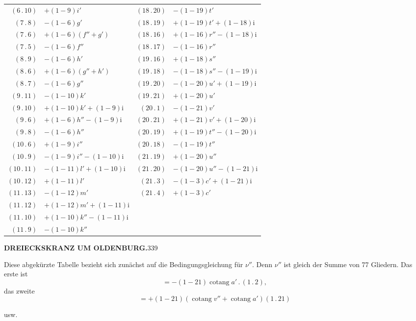 \begin{center}
\begin{tabular}{|r|l||r|l|}
\((6\,.\,10)\)&\(+(1-9)i'\)&\((18\,.\,20)\)&\(-(1-19)t'\)\\
\((7\,.\,8)\)&\(-(1-6)g'\)&\((18\,.\,19)\)&\(+(1-19)t'+(1-18)\mathrm{i}\)\\
\((7\,.\,6)\)&\(+(1-6)(f''+g')\)&\((18\,.\,16)\)&\(+(1-16)r''-(1-18)\mathrm{i}\)\\
\((7\,.\,5)\)&\(-(1-6)f''\)&\((18\,.\,17)\)&\(-(1-16)r''\)\\
\((8\,.\,9)\)&\(-(1-6)h'\)&\((19\,.\,16)\)&\(+(1-18)s''\)\\
\((8\,.\,6)\)&\(+(1-6)(g''+h')\)&\((19\,.\,18)\)&\(-(1-18)s''-(1-19)\mathrm{i}\)\\
\((8\,.\,7)\)&\(-(1-6)g''\)&\((19\,.\,20)\)&\(-(1-20)u'+(1-19)\mathrm{i}\)\\
\((9\,.\,11)\)&\(-(1-10)k'\)&\((19\,.\,21)\)&\(+(1-20)u'\)\\
\((9\,.\,10)\)&\(+(1-10)k'+(1-9)\mathrm{i}\)&\((20\,.\,1)\)&\(-(1-21)v'\)\\
\((9\,.\,6)\)&\(+(1-6)h''-(1-9)\mathrm{i}\)&\((20\,.\,21)\)&\(+(1-21)v'+(1-20)\mathrm{i}\)\\
\((9\,.\,8)\)&\(-(1-6)h''\)&\((20\,.\,19)\)&\(+(1-19)t''-(1-20)\mathrm{i}\)\\
\((10\,.\,6)\)&\(+(1-9)i''\)&\((20\,.\,18)\)&\(-(1-19)t''\)\\
\((10\,.\,9)\)&\(-(1-9)i''-(1-10)\mathrm{i}\)&\((21\,.\,19)\)&\(+(1-20)u''\)\\
\((10\,.\,11)\)&\(-(1-11)l'+(1-10)\mathrm{i}\)&\((21\,.\,20)\)&\(-(1-20)u''-(1-21)\mathrm{i}\)\\
\((10\,.\,12)\)&\(+(1-11)l'\)&\((21\,.\,3)\)&\(-(1-3)c'+(1-21)\mathrm{i}\)\\
\((11\,.\,13)\)&\(-(1-12)m'\)&\((21\,.\,4)\)&\(+(1-3)c'\)\\
\((11\,.\,12)\)&\(+(1-12)m'+(1-11)\mathrm{i}\)&&\\
\((11\,.\,10)\)&\(+(1-10)k''-(1-11)\mathrm{i}\)&&\\
\((11\,.\,9)\)&\(-(1-10)k''\)&&\\
\end{tabular}
\end{center}
\endgroup
\clearpage
\noindent\textbf{DREIECKSKRANZ UM OLDENBURG.}\hfill339\par\medskip
\par Diese abgekürzte Tabelle bezieht sich zunächst auf die Bedingungsgleichung für \(\nu''\). Denn \(\nu''\) ist gleich der Summe von 77 Gliedern. Das erste ist
\[
=-(1-21)\operatorname{cotang}a'\,.\,(1\,.\,2),
\]
\noindent das zweite
\[
=+(1-21)(\operatorname{cotang}v''+\operatorname{cotang}a')(1\,.\,21)
\]
\begin{center}usw.\end{center}

